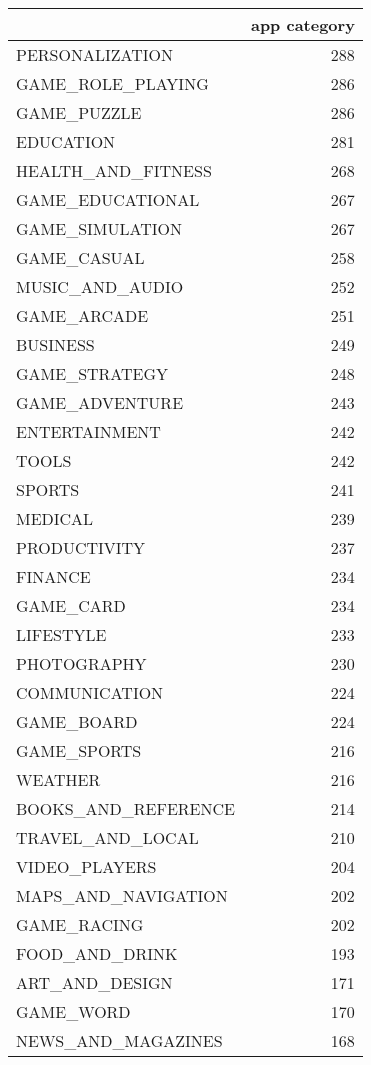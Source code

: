 \begin{tabular}{lr}
\toprule
{} &  app category \\
\midrule
PERSONALIZATION     &  288 \\
GAME\_ROLE\_PLAYING   &  286 \\
GAME\_PUZZLE         &  286 \\
EDUCATION           &  281 \\
HEALTH\_AND\_FITNESS  &  268 \\
GAME\_EDUCATIONAL    &  267 \\
GAME\_SIMULATION     &  267 \\
GAME\_CASUAL         &  258 \\
MUSIC\_AND\_AUDIO     &  252 \\
GAME\_ARCADE         &  251 \\
BUSINESS            &  249 \\
GAME\_STRATEGY       &  248 \\
GAME\_ADVENTURE      &  243 \\
ENTERTAINMENT       &  242 \\
TOOLS               &  242 \\
SPORTS              &  241 \\
MEDICAL             &  239 \\
PRODUCTIVITY        &  237 \\
FINANCE             &  234 \\
GAME\_CARD           &  234 \\
LIFESTYLE           &  233 \\
PHOTOGRAPHY         &  230 \\
COMMUNICATION       &  224 \\
GAME\_BOARD          &  224 \\
GAME\_SPORTS         &  216 \\
WEATHER             &  216 \\
BOOKS\_AND\_REFERENCE &  214 \\
TRAVEL\_AND\_LOCAL    &  210 \\
VIDEO\_PLAYERS       &  204 \\
MAPS\_AND\_NAVIGATION &  202 \\
GAME\_RACING         &  202 \\
FOOD\_AND\_DRINK      &  193 \\
ART\_AND\_DESIGN      &  171 \\
GAME\_WORD           &  170 \\
NEWS\_AND\_MAGAZINES  &  168 \\

\end{tabular}

